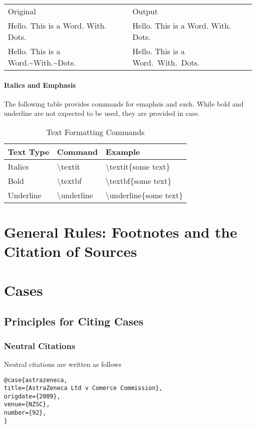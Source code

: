 \documentclass{nzlaw}
\newcommand{\s}{\textbackslash}
\begin{document}
\begin{tabular}{l l}
Original & Output \\
Hello. This is a Word. With. Dots. & Hello. This is a Word. With. Dots. \\

Hello. This is a Word.{\textasciitilde}With.{\textasciitilde}Dots. &Hello. This is a Word.~With.~Dots.
\end{tabular}

\paragraph{Italics and Emphasis}
The following table provides commands for emaphsis and such. While bold and underline are not expected to be used, they are provided in case.

\begin{table}[H]
\centering
\begin{tabular}{|l|l|l|}
\hline
Text Type & Command & Example \\ \hline
Italics & {\s}textit  & {\s}textit\{some text\}\\
Bold & {\s}textbf  & {\s}textbf\{some text\}\\
Underline & {\s}underline & {\s}underline\{some text\} \\
\hline
\end{tabular}
\caption{Text Formatting Commands}
\end{table}

\section{General Rules: Footnotes and the Citation of Sources}



\section{Cases}

\subsection{Principles for Citing Cases}

\subsubsection{Neutral Citations}
Neutral citations are written as follows
\begin{verbatim}
@case{astrazeneca,
title={AstraZeneca Ltd v Comerce Commission},
origdate={2009},
venue={NZSC},
number={92},
}
\end{verbatim}
\end{document}
